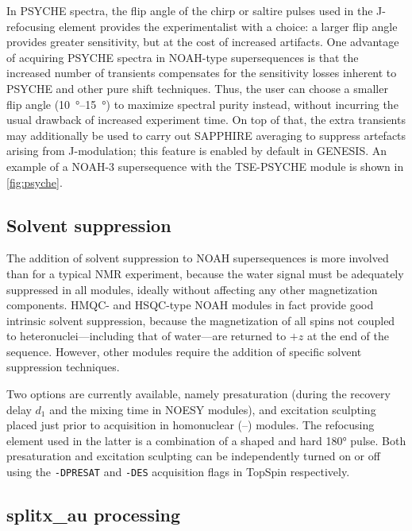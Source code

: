 \documentclass[a4paper,11pt]{article}
\newcommand{\proton}{\ch{^{1}H}}
\newcommand{\HH}{\proton{}--\proton{}}
\begin{document}
\begin{refsection}
In PSYCHE spectra, the flip angle of the chirp or saltire pulses used in the J-refocusing element provides the experimentalist with a choice: a larger flip angle provides greater sensitivity, but at the cost of increased artifacts.\autocite{Foroozandeh2018CEJ}
One advantage of acquiring PSYCHE spectra in NOAH-type supersequences is that the increased number of transients compensates for the sensitivity losses inherent to PSYCHE and other pure shift techniques.
Thus, the user can choose a smaller flip angle (\qtyrange{10}{15}{\degree}) to maximize spectral purity instead, without incurring the usual drawback of increased experiment time.
On top of that, the extra transients may additionally be used to carry out SAPPHIRE averaging\autocite{Moutzouri2017CC} to suppress artefacts arising from J-modulation; this feature is enabled by default in GENESIS.
An example of a NOAH-3 supersequence with the TSE-PSYCHE module is shown in \cref{fig:psyche}.

\subsection{Solvent suppression}
\label{subsec:solvsupp}

The addition of solvent suppression to NOAH supersequences is more involved than for a typical NMR experiment, because the water signal must be adequately suppressed in all modules, ideally without affecting any other magnetization components.
HMQC- and HSQC-type NOAH modules in fact provide good intrinsic solvent suppression, because the magnetization of all \proton{} spins not coupled to heteronuclei---including that of water---are returned to $+z$ at the end of the sequence.
However, other modules require the addition of specific solvent suppression techniques.

Two options are currently available, namely presaturation (during the recovery delay $d_1$ and the mixing time in NOESY modules), and excitation sculpting placed just prior to acquisition in homonuclear (\HH{}) modules\autocite{Hwang1995JMR}.
The refocusing element used in the latter is a combination of a shaped and hard \ang{180} pulse.
Both presaturation and excitation sculpting can be independently turned on or off using the \texttt{-DPRESAT} and \texttt{-DES} acquisition flags in TopSpin respectively.

\subsection{splitx\_au processing}
\label{subsec:splitx_au}


\end{refsection}
\end{document}
